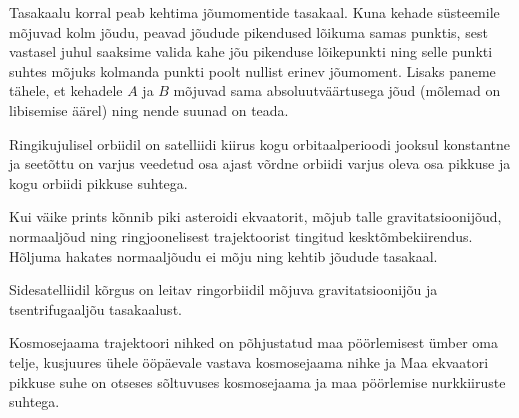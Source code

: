 \documentclass[10pt]{article}
\begin{document}
{%

\hint
Tasakaalu korral peab kehtima jõumomentide tasakaal. Kuna kehade süsteemile mõjuvad kolm jõudu, peavad jõudude pikendused lõikuma samas punktis, sest vastasel juhul saaksime valida kahe jõu pikenduse lõikepunkti ning selle punkti suhtes mõjuks kolmanda punkti poolt nullist erinev jõumoment. Lisaks paneme tähele, et kehadele $A$ ja $B$ mõjuvad sama absoluutväärtusega jõud (mõlemad on libisemise äärel) ning nende suunad on teada.
\probend
\bigskip


\hint
Ringikujulisel orbiidil on satelliidi kiirus kogu orbitaalperioodi jooksul konstantne ja seetõttu on varjus veedetud osa ajast võrdne orbiidi varjus oleva osa pikkuse ja kogu orbiidi pikkuse suhtega.
\probend
\bigskip


\hint
Kui väike prints kõnnib piki asteroidi ekvaatorit, mõjub talle gravitatsioonijõud, normaaljõud ning ringjoonelisest trajektoorist tingitud kesktõmbekiirendus. Hõljuma hakates normaaljõudu ei mõju ning kehtib jõudude tasakaal.
\probend
\bigskip


\hint
Sidesatelliidil kõrgus on leitav ringorbiidil mõjuva gravitatsioonijõu ja tsentrifugaaljõu tasakaalust.
\probend
\bigskip


\hint
Kosmosejaama trajektoori nihked on põhjustatud maa pöörlemisest ümber oma telje, kusjuures ühele ööpäevale vastava kosmosejaama nihke ja Maa ekvaatori pikkuse suhe on otseses sõltuvuses kosmosejaama ja maa pöörlemise nurkkiiruste suhtega.
\probend
\bigskip


}
\end{document}
